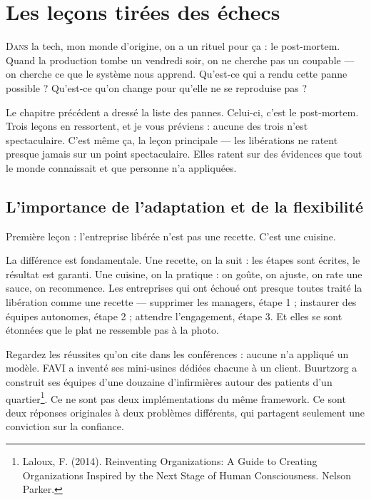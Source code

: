 
\chapter{Les leçons tirées des échecs}

\lettrine[lines=2]{D}{ans} la tech, mon monde d'origine, on a un rituel pour ça : le post-mortem. Quand la production tombe un vendredi soir, on ne cherche pas un coupable — on cherche ce que le système nous apprend. Qu'est-ce qui a rendu cette panne possible ? Qu'est-ce qu'on change pour qu'elle ne se reproduise pas ?

Le chapitre précédent a dressé la liste des pannes. Celui-ci, c'est le post-mortem. Trois leçons en ressortent, et je vous préviens : aucune des trois n'est spectaculaire. C'est même ça, la leçon principale — les libérations ne ratent presque jamais sur un point spectaculaire. Elles ratent sur des évidences que tout le monde connaissait et que personne n'a appliquées.

\section{L'importance de l'adaptation et de la flexibilité}

Première leçon : l'entreprise libérée n'est pas une recette. C'est une cuisine.

La différence est fondamentale. Une recette, on la suit : les étapes sont écrites, le résultat est garanti. Une cuisine, on la pratique : on goûte, on ajuste, on rate une sauce, on recommence. Les entreprises qui ont échoué ont presque toutes traité la libération comme une recette — supprimer les managers, étape 1 ; instaurer des équipes autonomes, étape 2 ; attendre l'engagement, étape 3. Et elles se sont étonnées que le plat ne ressemble pas à la photo.

Regardez les réussites qu'on cite dans les conférences : aucune n'a appliqué un modèle. FAVI a inventé ses mini-usines dédiées chacune à un client. Buurtzorg a construit ses équipes d'une douzaine d'infirmières autour des patients d'un quartier\footnote{Laloux, F. (2014). Reinventing Organizations: A Guide to Creating Organizations Inspired by the Next Stage of Human Consciousness. Nelson Parker.}. Ce ne sont pas deux implémentations du même framework. Ce sont deux réponses originales à deux problèmes différents, qui partagent seulement une conviction sur la confiance.

